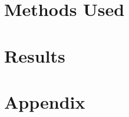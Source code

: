 \documentclass[12pt,notitlepage]{report}
\begin{document}


\chapter{Methods Used}




\chapter{Results}



\chapter{Appendix}







\end{document}
